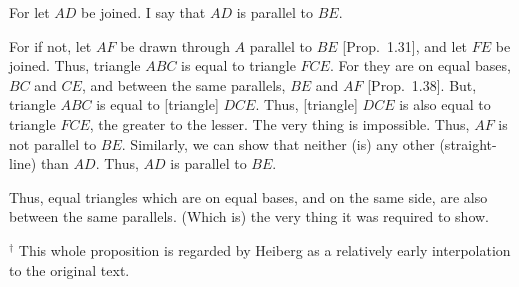 \begin{Parallel}{}{}
{For let $AD$ be joined. I say that $AD$ is parallel to $BE$.

For if not, let $AF$ be drawn through $A$ parallel to $BE$ [Prop.~1.31],
and let $FE$ be joined. Thus, triangle $ABC$ is equal to triangle
$FCE$. For they are on equal bases, $BC$ and $CE$, and between the same
parallels, $BE$ and $AF$ [Prop.~1.38]. But, triangle $ABC$ is equal to [triangle] $DCE$.
Thus, [triangle] $DCE$ is also equal to triangle $FCE$, the greater to the
lesser. The very thing is impossible. 
Thus, $AF$ is not parallel to $BE$. Similarly, we can show that neither (is)
any other (straight-line) than $AD$. Thus, $AD$ is parallel to $BE$.

Thus, equal triangles which are on equal bases, and on the same side, are also
between the same parallels. (Which is) the very thing it was required to show.}
\end{Parallel}
{\footnotesize \noindent$^\dag$ This whole proposition is regarded by
Heiberg as a relatively early interpolation to the original text.\\}

